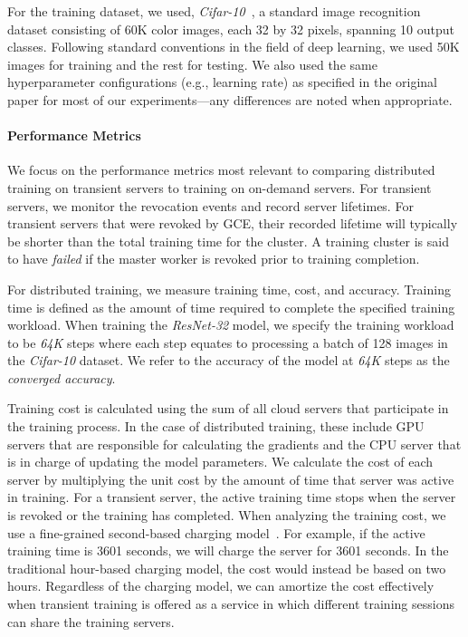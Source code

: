 For the training dataset, we used, \emph{Cifar-10}~\cite{krizhevsky2009learning}, a standard image
recognition dataset consisting of 60K color images, each 32 by 32 pixels,
spanning 10 output classes. Following standard conventions in the field of deep
learning, we used 50K images for training and the rest for testing. We also
used the same hyperparameter configurations (e.g., learning rate) as specified
in the original paper for most of our experiments---any differences are noted
when appropriate.

\paragraph{Performance Metrics}

We focus on the performance metrics most  relevant  to comparing
distributed training on transient servers to training on on-demand servers.
For transient servers, we monitor the revocation events and record server 
lifetimes. For transient servers that were revoked by
GCE, their recorded lifetime will typically be shorter than the total training
time for the cluster.  A training cluster is said to have
\emph{failed} if the master worker is revoked prior to training completion.

For distributed training, we measure training time, cost, and
accuracy.  Training time is defined as the amount of time required to complete
the specified training workload. When training the \emph{ResNet-32} model, we
specify the training workload to be \emph{64K} steps where each step equates to
processing a batch of 128 images in the \emph{Cifar-10} dataset. We refer to the 
accuracy of the model  at  \emph{64K} steps as the \emph{converged accuracy}.
 
Training cost is calculated using the sum of all cloud servers that participate
in the training process. In the case of distributed training, these include GPU
servers that are responsible for calculating the gradients and the CPU server
that is in charge of updating the model parameters. We calculate the cost of
each server by multiplying the unit cost by the amount of time that server was
active in training. For a transient server, the active training time stops when
the server is revoked or the training has completed. When analyzing the
training cost, we use a fine-grained second-based charging model~\cite{billing}. For
example, if the active training time is 3601 seconds, we will charge the server
for 3601 seconds. In the traditional hour-based charging model, the cost would
instead be based on two hours. Regardless of the charging model, we can
amortize the cost effectively when  transient training is offered as a service
in which different training sessions can share the training servers. 

